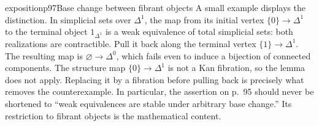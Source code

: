 \begin{dcomment}{exposition}{p97}{Base change between fibrant objects}
A small example displays the distinction. In simplicial sets over $\Delta^1$, the map from its initial vertex $\{0\}\to\Delta^1$ to the terminal object $1_{\Delta^1}$ is a weak equivalence of total simplicial sets: both realizations are contractible. Pull it back along the terminal vertex $\{1\}\to\Delta^1$. The resulting map is $\varnothing\to\Delta^0$, which fails even to induce a bijection of connected components. The structure map $\{0\}\to\Delta^1$ is not a Kan fibration, so the lemma does not apply. Replacing it by a fibration before pulling back is precisely what removes the counterexample. In particular, the assertion on p.~95 should never be shortened to ``weak equivalences are stable under arbitrary base change.'' Its restriction to fibrant objects is the mathematical content.
\end{dcomment}

